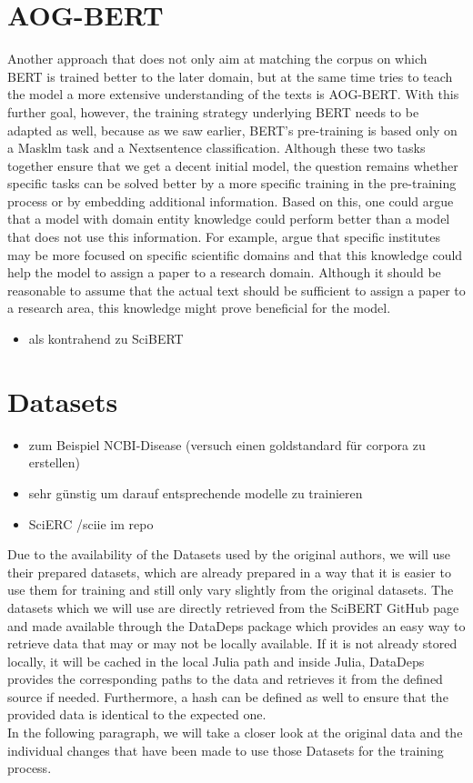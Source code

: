 \color{red}
\section{AOG-BERT}
	Another approach that does not only aim at matching the corpus on which BERT is trained better to the later domain, but at the same time tries to teach the model a more extensive understanding of the texts is AOG-BERT. With this further goal, however, the training strategy underlying BERT needs to be adapted as well, because as we saw earlier, BERT's pre-training is based only on a Masklm task and a Nextsentence classification. Although these two tasks together ensure that we get a decent initial model, the question remains whether specific tasks can be solved better by a more specific training in the pre-training process or by embedding additional information.
	Based on this, one could argue that a model with domain entity knowledge could perform better than a model that does not use this information. For example, \citeauthor{Liu2021} argue that specific institutes may be more focused on specific scientific domains and that this knowledge could help the model to assign a paper to a research domain. Although it should be reasonable to assume that the actual text should be sufficient to assign a paper to a research area, this knowledge might prove beneficial for the model. 
\begin{itemize}
	\item als kontrahend zu SciBERT \cite{Liu2021}
\end{itemize}
\color{ForestGreen}
\section{Datasets}
\begin{itemize}
	\item zum Beispiel NCBI-Disease (versuch einen goldstandard für corpora zu erstellen)
	\item sehr günstig um darauf entsprechende modelle zu trainieren \cite{Dogan2014}
	\item SciERC /sciie im repo \cite{luan2018multitask}
\end{itemize}
\color{black}
Due to the availability of the Datasets used by the original authors, we will use their prepared datasets, which are already prepared in a way that it is easier to use them for training and still only vary slightly from the original datasets. The datasets which we will use are directly retrieved from the SciBERT GitHub page and made available through the DataDeps package which provides an easy way to retrieve data that may or may not be locally available. If it is not already stored locally, it will be cached in the local Julia path and inside Julia, DataDeps provides the corresponding paths to the data and retrieves it from the defined source if needed. Furthermore, a hash can be defined as well to ensure that the provided data is identical to the expected one.\cite{White2019}\\
In the following paragraph, we will take a closer look at the original data and the individual changes that have been made to use those Datasets for the training process.
